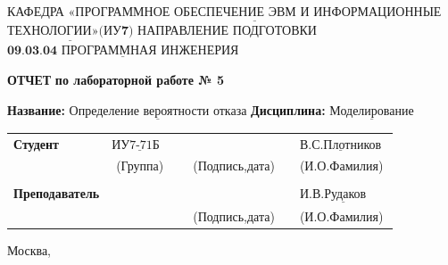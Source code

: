 \documentclass[12pt,a4paper,oneside]{report}
\begin{document}
\noindent КАФЕДРА $\underline{\textbf{«ПРОГРАММНОЕ ОБЕСПЕЧЕНИЕ ЭВМ И ИНФОРМАЦИОННЫЕ}}$\newline\newline $\underline{\textbf{ТЕХНОЛОГИИ»(ИУ7)}}$\newline\newline
\noindent НАПРАВЛЕНИЕ ПОДГОТОВКИ $\underline{\textbf{09.03.04 ПРОГРАММНАЯ ИНЖЕНЕРИЯ}}$\newline\newline\newline\newline\newline\newline\newline
\begin{center}
    \begin{flushright}
    \Large\textbf{ОТЧЕТ}\newline
	\Large\textbf{по лабораторной работе № 5}\newline
	\end{flushright}
\end{center}
\noindent\textbf{Название:} $\underline{\text{Определение вероятности отказа}}$\newline\newline
\noindent\textbf{Дисциплина:} $\underline{\text{Моделирование}}$\newline\newline\newline\newline\newline\newline\newline\newline
\begin{tabular}{lcp{5em}lp{2em}l}
	\noindent\textbf{Студент} &  $\underline{\text{ИУ7-71Б~~}}$ &             &\hspace{1cm} & & $\underline{\text{В.С.Плотников}}$ \\\cline{4-3}
	 & (Группа) & &(Подпись,дата)  & & (И.О.Фамилия) \\
	 & & & & &\\
	\noindent\textbf{Преподаватель} &  & &\hspace{1cm} & &$\underline{\text{И.В.Рудаков ~~~~}}$ \\\cline{4-3} 
	 &  & & (Подпись,дата)  & &(И.О.Фамилия) \\
    \end{tabular}
\begin{center}
	\vfill
	Москва, \the\year
\end{center}
\clearpage
\end{document}
